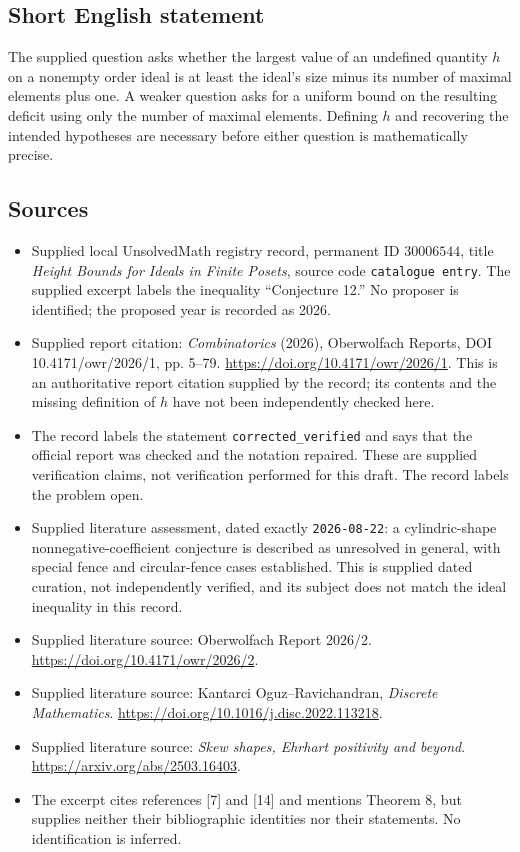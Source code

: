 \documentclass[11pt]{article}
\begin{document}
\subsection{Short English statement}
The supplied question asks whether the largest value of an undefined quantity \(h\) on a nonempty order ideal is at least the ideal's size minus its number of maximal elements plus one. A weaker question asks for a uniform bound on the resulting deficit using only the number of maximal elements. Defining \(h\) and recovering the intended hypotheses are necessary before either question is mathematically precise.
\subsection{Sources}
\begin{itemize}
\item Supplied local UnsolvedMath registry record, permanent ID \(30006544\), title \emph{Height Bounds for Ideals in Finite Posets}, source code \texttt{catalogue entry}. The supplied excerpt labels the inequality ``Conjecture 12.'' No proposer is identified; the proposed year is recorded as 2026.
\item Supplied report citation: \emph{Combinatorics} (2026), Oberwolfach Reports, DOI 10.4171/owr/2026/1, pp. 5--79. \url{https://doi.org/10.4171/owr/2026/1}. This is an authoritative report citation supplied by the record; its contents and the missing definition of \(h\) have not been independently checked here.
\item The record labels the statement \texttt{corrected\_verified} and says that the official report was checked and the notation repaired. These are supplied verification claims, not verification performed for this draft. The record labels the problem open.
\item Supplied literature assessment, dated exactly \texttt{2026-08-22}: a cylindric-shape nonnegative-coefficient conjecture is described as unresolved in general, with special fence and circular-fence cases established. This is supplied dated curation, not independently verified, and its subject does not match the ideal inequality in this record.
\item Supplied literature source: Oberwolfach Report 2026/2. \url{https://doi.org/10.4171/owr/2026/2}.
\item Supplied literature source: Kantarci Oguz--Ravichandran, \emph{Discrete Mathematics}. \url{https://doi.org/10.1016/j.disc.2022.113218}.
\item Supplied literature source: \emph{Skew shapes, Ehrhart positivity and beyond}. \url{https://arxiv.org/abs/2503.16403}.
\item The excerpt cites references [7] and [14] and mentions Theorem 8, but supplies neither their bibliographic identities nor their statements. No identification is inferred.
\end{itemize}
\end{document}
